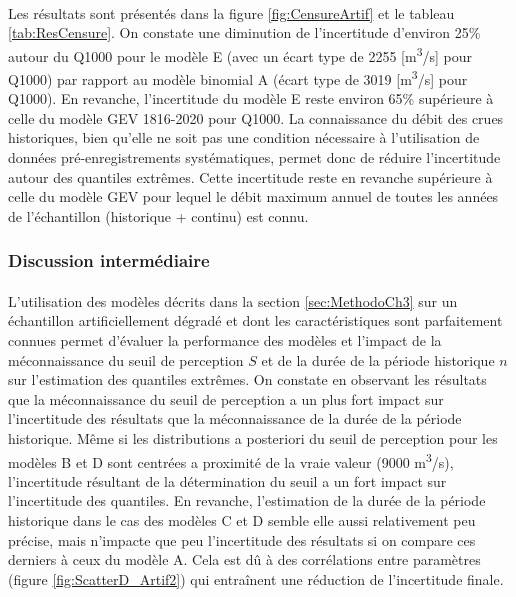 \documentclass[11pt]{article}
\begin{document}
	\paragraph{}
	Les résultats sont présentés dans la figure \ref{fig:CensureArtif} et le tableau \ref{tab:ResCensure}. On constate une diminution de l'incertitude d'environ 25\% autour du Q1000 pour le modèle E (avec un écart type de 2255 [m\textsuperscript{3}/s] pour Q1000) par rapport au modèle binomial A (écart type de 3019 [m\textsuperscript{3}/s] pour Q1000). En revanche, l'incertitude du modèle E reste environ 65\% supérieure à celle du modèle GEV 1816-2020 pour Q1000. La connaissance du débit des crues historiques, bien qu'elle ne soit pas une condition nécessaire à l'utilisation de données pré-enregistrements systématiques, permet donc de réduire l'incertitude autour des quantiles extrêmes. Cette incertitude reste en revanche supérieure à celle du modèle GEV pour lequel le débit maximum annuel de toutes les années de l'échantillon (historique + continu) est connu.	

	\subsubsection{Discussion intermédiaire}
	
	\paragraph{} L'utilisation des modèles décrits dans la section \ref{sec:MethodoCh3} sur un échantillon artificiellement dégradé et dont les caractéristiques sont parfaitement connues permet d'évaluer la performance des modèles et l'impact de la méconnaissance du seuil de perception $S$ et de la durée de la période historique $n$ sur l'estimation des quantiles extrêmes. On constate en observant les résultats que la méconnaissance du seuil de perception a un plus fort impact sur l'incertitude des résultats que la méconnaissance de la durée de la période historique. Même si les distributions a posteriori du seuil de perception pour les modèles B et D sont centrées a proximité de la vraie valeur (9000 m\textsuperscript{3}/s), l'incertitude résultant de la détermination du seuil a un fort impact sur l'incertitude des quantiles. En revanche, l'estimation de la durée de la période historique dans le cas des modèles C et D semble elle aussi relativement peu précise, mais n'impacte que peu l'incertitude des résultats si on compare ces derniers à ceux du modèle A. Cela est dû à des corrélations entre paramètres (figure \ref{fig:ScatterD_Artif2}) qui entraînent une réduction de l'incertitude finale.
	 
\end{document}
